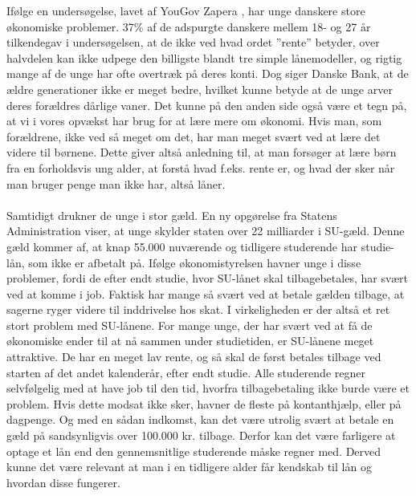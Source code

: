  Ifølge en undersøgelse, lavet af YouGov Zapera \cite{DanskeB1}, har unge danskere store økonomiske problemer. 37\% af de adspurgte danskere mellem 18- og 27 år tilkendegav i undersøgelsen, at de ikke ved hvad ordet ”rente” betyder, over halvdelen kan ikke udpege den billigste blandt tre simple lånemodeller, og rigtig mange af de unge har ofte overtræk på deres konti. Dog siger Danske Bank, at de ældre generationer ikke er meget bedre, hvilket kunne betyde at de unge arver deres forældres dårlige vaner. Det kunne på den anden side også være et tegn på, at vi i vores opvækst har brug for at lære mere om økonomi. Hvis man, som forældrene, ikke ved så meget om det, har man meget svært ved at lære det videre til børnene. Dette giver altså anledning til, at man forsøger at lære børn fra en forholdsvis ung alder, at forstå hvad f.eks. rente er, og hvad der sker når man bruger penge man ikke har, altså låner.    \\
\\
Samtidigt drukner de unge i stor gæld. En ny opgørelse fra Statens Administration viser, at unge skylder staten over 22 milliarder i SU-gæld. Denne gæld kommer af, at knap 55.000 \cite{dr.dk} nuværende og tidligere studerende har studie-lån, som ikke er afbetalt på. Ifølge økonomistyrelsen havner unge i disse problemer, fordi de efter endt studie, hvor SU-lånet skal tilbagebetales, har svært ved at komme i job\cite{jobindex}. Faktisk har mange så svært ved at betale gælden tilbage, at sagerne ryger videre til inddrivelse hos skat\cite{BusinessDK1}. I virkeligheden er der altså et ret stort problem med SU-lånene. For mange unge, der har svært ved at få de økonomiske ender til at nå sammen under studietiden, er SU-lånene meget attraktive. De har en meget lav rente, og så skal de først betales tilbage ved starten af det andet kalenderår, efter endt studie. Alle studerende regner selvfølgelig med at have job til den tid, hvorfra tilbagebetaling ikke burde være et problem. Hvis dette modsat ikke sker, havner de fleste på kontanthjælp, eller på dagpenge. Og med en sådan indkomst, kan det være utrolig svært at betale en gæld på sandsynligvis over 100.000 kr. tilbage. Derfor kan det være farligere at optage et lån end den gennemsnitlige studerende måske regner med. Derved kunne det være relevant at man i en tidligere alder får kendskab til lån og hvordan disse fungerer.  \\
\\
